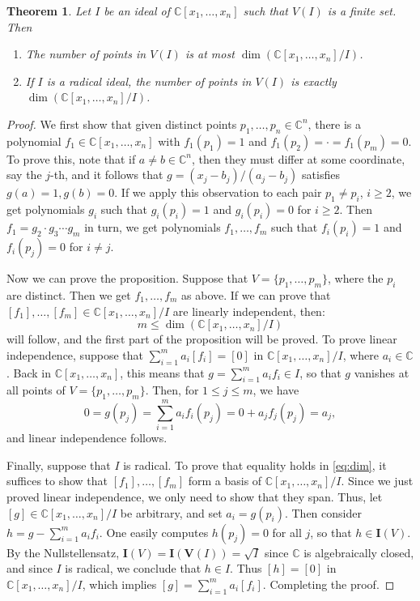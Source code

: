 \documentclass[a4paper,12pt]{article}
\newtheorem{theorem}{Theorem}[section]
\newcommand{\CC}{\mathbb{C}}
\newcommand{\vrty}{\textbf{V}}
\newcommand{\idl}{\textbf{I}}
\begin{document}
\begin{theorem}\label{theo:numberofpoints}
	Let $ I $ be an ideal of $ \CC[x_1,\ldots,x_n]$ such that $ V(I) $ is a finite set. Then 
	\begin{enumerate}[label=(\roman*)]
		\item The number of points in $ V(I) $ is at most $ \dim \left( \CC[x_1,\ldots,x_n]/I\right)  $.
		\item If $ I $ is a radical ideal, the number of points in $ V(I) $ is exactly $ \dim \left( \CC[x_1,\ldots,x_n]/I\right)  $.
	\end{enumerate}
\end{theorem}

\begin{proof}
We first show that given distinct points $p_1, \ldots, p_n \in \CC^n$, there is a polynomial $f_1 \in \CC[x_1, \ldots, x_n]$ with $f_1(p_1) = 1$ and $f_1(p_2) = \cdot = f_1(p_m) = 0$. To prove this, note that if $a\neq b \in \CC^n$, then they must differ at some coordinate, say the $j$-th, and it follows that $g = (x_j - b_j)/(a_j - b_j)$ satisfies $g(a) = 1, g(b) = 0$. If we apply this observation to each pair $p_1 \neq p_i$, $i \geq 2$, we get polynomials $g_i$ such that $g_i(p_i) = 1$ and $g_i(p_i) = 0$ for $i \geq 2$. Then $f_1 = g_2 \cdot g_3 \cdots g_m$ in turn, we get polynomials $f_1, \ldots, f_m$ such that $f_i(p_i) = 1$ and $f_i(p_j) = 0$ for $i \neq j$.

Now we can prove the proposition. Suppose that $V = \{p_1, \ldots, p_m\}$, where the $p_i$ are distinct. Then we get $f_1, \ldots, f_m$ as above. If we can prove that $[f_1], \ldots, [f_m] \in \CC[x_1, \ldots, x_n]/I$ are linearly independent, then:
\begin{equation}\label{eq:dim}
	m \leq \dim(\CC[x_1, \ldots, x_n]/I)
\end{equation}
will follow, and the first part of the proposition will be proved.
To prove linear independence, suppose that $\sum_{i=1}^{m} a_i[f_i] = [0]$ in $\CC[x_1, \ldots, x_n]/I$, where $a_i \in \CC$. Back in $\CC[x_1, \ldots, x_n]$, this means that $g = \sum_{i=1}^{m}a_if_i \in I$, so that $g$ vanishes at all points of $V = \{p_1, \ldots, p_m\}$. Then, for $1 \leq j \leq m$, we have 
$$ 
0 = g(p_j)= \sum_{i=1}^{m} a_i f_i(p_j) = 0 + a_j f_j (p_j) = a_j,
$$
and linear independence follows.

Finally, suppose that $I$ is radical. To prove that equality holds in \ref{eq:dim}, it suffices to show that $[f_1], \ldots, [f_m]$ form a basis of $\CC[x_1, \ldots, x_n]/I$. Since we just proved linear independence, we only need to show that they span. Thus, let $[g] \in \CC[x_1, \ldots, x_n]/I$ be arbitrary, and set $a_i = g(p_i)$. Then consider $h = g - \sum_{i=1}^{m}a_i f_i$. One easily computes $h(p_j) = 0$ for all $j$, so that $h \in \idl(V)$. By the Nullstellensatz, $\idl(V) = \idl(\vrty(I)) = \sqrt{I}$ since $\CC$ is algebraically closed, and since $I$ is radical, we conclude that $h \in I$. Thus $[h] = [0]$ in $\CC[x_1, \ldots, x_n]/I$, which implies $[g] = \sum_{i=1}^{m} a_i[f_i]$. Completing the proof.  
\end{proof}
\end{document}

